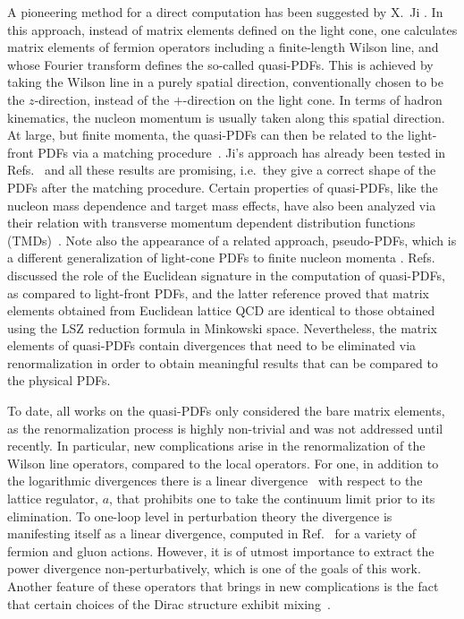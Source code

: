 \medskip
A pioneering method for a direct computation has been suggested by X.~Ji \cite{Ji:2013dva}.
In this approach, instead of matrix elements defined on the light cone, one calculates matrix elements
of fermion operators including a finite-length Wilson line, and whose Fourier transform defines the so-called
quasi-PDFs. This is achieved by taking the Wilson line in a purely spatial direction, conventionally chosen
to be the $z$-direction, instead of the $+$-direction on the light cone.
In terms of hadron kinematics, the nucleon momentum is usually taken along this spatial direction.
At large, but finite momenta, the quasi-PDFs can then be related to the light-front
PDFs via a matching procedure~\cite{Xiong:2013bka,Chen:2016fxx}. Ji's approach has already been tested in
Refs.~\cite{Lin:2014zya,Gamberg:2014zwa,Alexandrou:2015rja,Chen:2016utp,Alexandrou:2016jqi} and all these results
are promising, i.e.\ they give a correct shape of the PDFs after the matching procedure. Certain properties of quasi-PDFs,
like the nucleon mass dependence and target mass effects, have also been analyzed via their relation with transverse momentum
dependent distribution functions (TMDs)~\cite{Radyushkin:2017ffo,Radyushkin:2016hsy}.
Note also the appearance of a related approach, pseudo-PDFs, which is a different generalization of light-cone PDFs to finite nucleon momenta \cite{Radyushkin:2017cyf,Orginos:2017kos}.
Refs.~\cite{Carlson:2017gpk,Briceno:2017cpo} discussed the role of the Euclidean signature in the computation of quasi-PDFs, as compared to light-front PDFs, and the latter reference proved that matrix elements obtained from Euclidean lattice QCD are identical to those obtained using the LSZ reduction formula in Minkowski space.
Nevertheless, the matrix elements of quasi-PDFs contain divergences that need to be eliminated via renormalization in order to obtain
meaningful results that can be compared to the physical PDFs.

\medskip
To date, all works on the quasi-PDFs only considered the bare matrix elements, as the renormalization process is
highly non-trivial and was not addressed until recently. In particular, new complications arise in the
renormalization of the Wilson line operators, compared to the local operators. For one, in addition to the
logarithmic divergences there is a linear divergence~\cite{Dotsenko:1979wR} with respect to the lattice regulator,
$a$, that prohibits one to take the continuum limit prior to its elimination. To one-loop level in perturbation theory the
divergence is manifesting itself as a linear divergence, computed in Ref.~\cite{Constantinou:2017sej} for a variety
of fermion and gluon actions. However, it is of utmost importance to extract the power divergence non-perturbatively,
which is one of the goals of this work.  Another feature of these operators that brings in new complications is the fact
that certain choices of the Dirac structure exhibit mixing~\cite{Constantinou:2017sej}.

